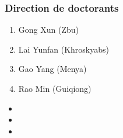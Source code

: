 \documentclass[xcolor=table]{beamer}
\begin{document}
  \begin{frame} 
 \frametitle{Direction de doctorants} 

\begin{enumerate}
\item Gong Xun (Zbu)
\item Lai Yunfan (Khroskyabs)
\item Gao Yang (Menya)
\item Rao Min (Guiqiong)
\end{enumerate}
 \small
\begin{itemize}
\item  {}
\item  {}  
\item  {}
\end{itemize}   
  \end{frame}   
\end{document}
